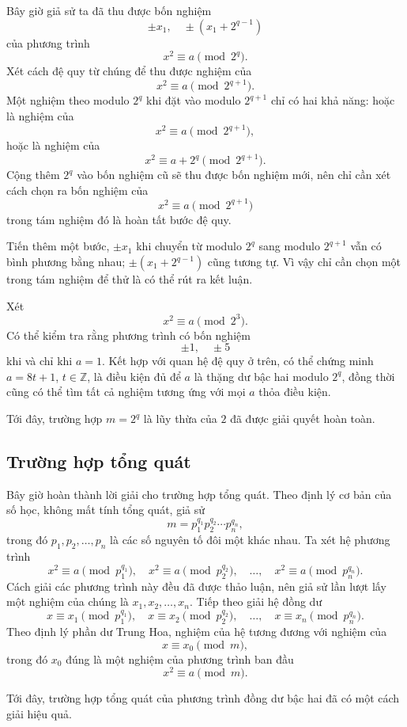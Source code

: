 \documentclass[11pt]{article}
\begin{document}
Bây giờ giả sử ta đã thu được bốn nghiệm
\[
  \pm x_1,\quad \pm(x_1+2^{q-1})
\]
của phương trình
\[
  x^2\equiv a\pmod {2^q}.
\]
Xét cách đệ quy từ chúng để thu được nghiệm của
\[
  x^2\equiv a\pmod {2^{q+1}}.
\]
Một nghiệm theo modulo $2^q$ khi đặt vào modulo $2^{q+1}$ chỉ có hai khả
năng: hoặc là nghiệm của
\[
  x^2\equiv a\pmod {2^{q+1}},
\]
hoặc là nghiệm của
\[
  x^2\equiv a+2^q\pmod {2^{q+1}}.
\]
Cộng thêm $2^q$ vào bốn nghiệm cũ sẽ thu được bốn nghiệm mới, nên chỉ cần xét
cách chọn ra bốn nghiệm của
\[
  x^2\equiv a\pmod {2^{q+1}}
\]
trong tám nghiệm đó là hoàn tất bước đệ quy.

Tiến thêm một bước, $\pm x_1$ khi chuyển từ modulo $2^q$ sang modulo
$2^{q+1}$ vẫn có bình phương bằng nhau; $\pm(x_1+2^{q-1})$ cũng tương tự. Vì
vậy chỉ cần chọn một trong tám nghiệm để thử là có thể rút ra kết luận.

Xét
\[
  x^2\equiv a\pmod {2^3}.
\]
Có thể kiểm tra rằng phương trình có bốn nghiệm
\[
  \pm 1,\quad \pm 5
\]
khi và chỉ khi $a=1$. Kết hợp với quan hệ đệ quy ở trên, có thể chứng minh
$a=8t+1$, $t\in\mathbb Z$, là điều kiện đủ để $a$ là thặng dư bậc hai modulo
$2^q$, đồng thời cũng có thể tìm tất cả nghiệm tương ứng với mọi $a$ thỏa
điều kiện.

Tới đây, trường hợp $m=2^q$ là lũy thừa của $2$ đã được giải quyết hoàn toàn.

\subsection{Trường hợp tổng quát}

Bây giờ hoàn thành lời giải cho trường hợp tổng quát. Theo định lý cơ bản của
số học, không mất tính tổng quát, giả sử
\[
  m=p_1^{q_1}p_2^{q_2}\cdots p_n^{q_n},
\]
trong đó $p_1,p_2,\ldots,p_n$ là các số nguyên tố đôi một khác nhau. Ta xét hệ
phương trình
\[
  x^2\equiv a\pmod {p_1^{q_1}},\quad
  x^2\equiv a\pmod {p_2^{q_2}},\quad \ldots,\quad
  x^2\equiv a\pmod {p_n^{q_n}}.
\]
Cách giải các phương trình này đều đã được thảo luận, nên giả sử lần lượt lấy
một nghiệm của chúng là $x_1,x_2,\ldots,x_n$. Tiếp theo giải hệ đồng dư
\[
  x\equiv x_1\pmod {p_1^{q_1}},\quad
  x\equiv x_2\pmod {p_2^{q_2}},\quad \ldots,\quad
  x\equiv x_n\pmod {p_n^{q_n}}.
\]
Theo định lý phần dư Trung Hoa, nghiệm của hệ tương đương với nghiệm của
\[
  x\equiv x_0\pmod m,
\]
trong đó $x_0$ đúng là một nghiệm của phương trình ban đầu
\[
  x^2\equiv a\pmod m.
\]

Tới đây, trường hợp tổng quát của phương trình đồng dư bậc hai đã có một cách
giải hiệu quả.
\end{document}
